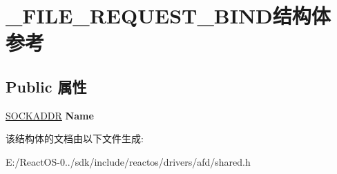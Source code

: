 \hypertarget{struct___f_i_l_e___r_e_q_u_e_s_t___b_i_n_d}{}\section{\+\_\+\+F\+I\+L\+E\+\_\+\+R\+E\+Q\+U\+E\+S\+T\+\_\+\+B\+I\+N\+D结构体 参考}
\label{struct___f_i_l_e___r_e_q_u_e_s_t___b_i_n_d}
\subsection*{Public 属性}
\begin{DoxyCompactItemize}
\item 
\mbox{\label{struct___f_i_l_e___r_e_q_u_e_s_t___b_i_n_d_af00e1a5f5605098649cb48df83ca6188}} 
\hyperlink{structsockaddr}{S\+O\+C\+K\+A\+D\+DR} {\bfseries Name}
\end{DoxyCompactItemize}


该结构体的文档由以下文件生成\+:\begin{DoxyCompactItemize}
\item 
E\+:/\+React\+O\+S-\/0../sdk/include/reactos/drivers/afd/shared.\+h\end{DoxyCompactItemize}
